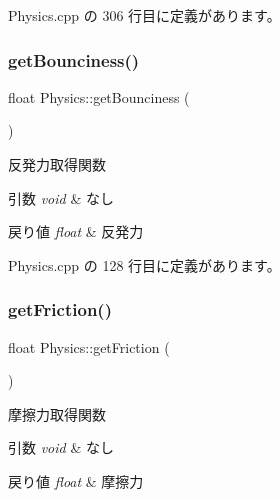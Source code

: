  Physics.\+cpp の 306 行目に定義があります。

\mbox{\label{class_physics_afa061352341f5c53745433672be775bb}} 
\subsubsection{\texorpdfstring{get\+Bounciness()}{getBounciness()}}
{\footnotesize\ttfamily float Physics\+::get\+Bounciness (\begin{DoxyParamCaption}{ }\end{DoxyParamCaption})}



反発力取得関数 


\begin{DoxyParams}{引数}
{\em void} & なし \\
\hline
\end{DoxyParams}

\begin{DoxyRetVals}{戻り値}
{\em float} & 反発力 \\
\hline
\end{DoxyRetVals}


 Physics.\+cpp の 128 行目に定義があります。

\mbox{\label{class_physics_ad85a3df693d588f8ff528566c5218533}} 
\subsubsection{\texorpdfstring{get\+Friction()}{getFriction()}}
{\footnotesize\ttfamily float Physics\+::get\+Friction (\begin{DoxyParamCaption}{ }\end{DoxyParamCaption})}



摩擦力取得関数 


\begin{DoxyParams}{引数}
{\em void} & なし \\
\hline
\end{DoxyParams}

\begin{DoxyRetVals}{戻り値}
{\em float} & 摩擦力 \\
\hline
\end{DoxyRetVals}


